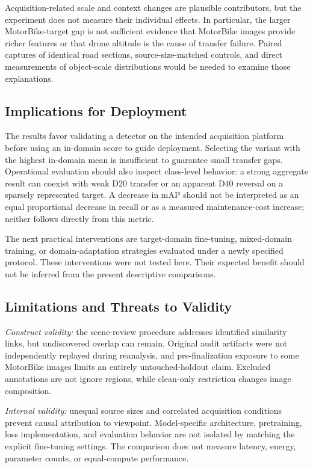 \documentclass[conference,a4paper]{IEEEtran}
\begin{document}
Acquisition-related scale and context changes are plausible contributors, but the experiment does not measure their individual effects. In particular, the larger MotorBike-target gap is not sufficient evidence that MotorBike images provide richer features or that drone altitude is the cause of transfer failure. Paired captures of identical road sections, source-size-matched controls, and direct measurements of object-scale distributions would be needed to examine those explanations.

\subsection{Implications for Deployment}
The results favor validating a detector on the intended acquisition platform before using an in-domain score to guide deployment. Selecting the variant with the highest in-domain mean is insufficient to guarantee small transfer gaps. Operational evaluation should also inspect class-level behavior: a strong aggregate result can coexist with weak D20 transfer or an apparent D40 reversal on a sparsely represented target. A decrease in mAP should not be interpreted as an equal proportional decrease in recall or as a measured maintenance-cost increase; neither follows directly from this metric.

The next practical interventions are target-domain fine-tuning, mixed-domain training, or domain-adaptation strategies evaluated under a newly specified protocol. These interventions were not tested here. Their expected benefit should not be inferred from the present descriptive comparisons.

\subsection{Limitations and Threats to Validity}
\emph{Construct validity:} the scene-review procedure addresses identified similarity links, but undiscovered overlap can remain. Original audit artifacts were not independently replayed during reanalysis, and pre-finalization exposure to some MotorBike images limits an entirely untouched-holdout claim. Excluded annotations are not ignore regions, while clean-only restriction changes image composition.

\emph{Internal validity:} unequal source sizes and correlated acquisition conditions prevent causal attribution to viewpoint. Model-specific architecture, pretraining, loss implementation, and evaluation behavior are not isolated by matching the explicit fine-tuning settings. The comparison does not measure latency, energy, parameter counts, or equal-compute performance.
\end{document}
